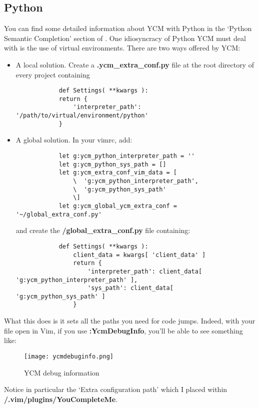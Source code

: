 \subsection{Python}
You can find some detailed information about YCM with Python in the `Python
Semantic Completion' section of \cite{ycmcore2017ycm}. One idiosyncracy of
Python YCM must deal with is the use of virtual environments. There are two ways
offered by YCM:
\begin{itemize}
    \item A local solution. Create a \textbf{.ycm\_extra\_conf.py} file at the
        root directory of every project containing
        \begin{lstlisting}
            def Settings( **kwargs ):
            return {
                'interpreter_path': '/path/to/virtual/environment/python'
            }
        \end{lstlisting}
    \item A global solution. In your vimrc, add:
        \begin{lstlisting}
            let g:ycm_python_interpreter_path = ''
            let g:ycm_python_sys_path = []
            let g:ycm_extra_conf_vim_data = [
                \  'g:ycm_python_interpreter_path',
                \  'g:ycm_python_sys_path'
                \]
            let g:ycm_global_ycm_extra_conf = '~/global_extra_conf.py'
        \end{lstlisting}
        and create the \textbf{\tsim/global\_extra\_conf.py} file containing:
        \begin{lstlisting}
            def Settings( **kwargs ):
                client_data = kwargs[ 'client_data' ]
                return {
                    'interpreter_path': client_data[ 'g:ycm_python_interpreter_path' ],
                    'sys_path': client_data[ 'g:ycm_python_sys_path' ]
                }
        \end{lstlisting}
\end{itemize}
What this does is it sets all the paths you need for code jumps. Indeed, with
your file open in Vim, if you use \textbf{:YcmDebugInfo}, you'll be able to see
something like:
\begin{figure}[H]
    \centering
    \texttt{[image: ycmdebuginfo.png]}
    \caption{YCM debug information}
    \label{FigYcmDebugInfo}
\end{figure}
Notice in particular the `Extra configuration path' which I placed within
\textbf{\tsim/.vim/plugins/YouCompleteMe}.\\

